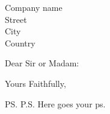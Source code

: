 \documentclass{letter}
\begin{document}
\begin{letter}{Company name \\ Street\\ City\\ Country}
\opening{Dear Sir or Madam:}
\lipsum[1-4]

\begin{flushright}
   \closing{Yours Faithfully,}
\end{flushright}


\ps{P.S. Here goes your ps.}
\end{letter}
\end{document}
